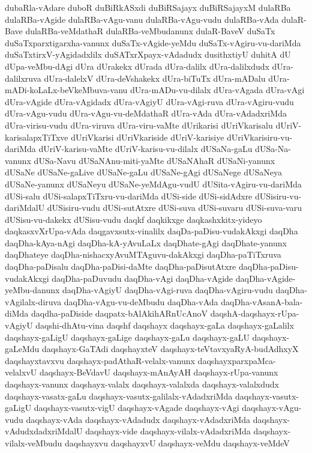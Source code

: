 {dubaRla-vAdare
duboR
duBiRkASxdi
duBiRSajayx
duBiRSajayxM
dulaRBa
dulaRBa-vAgide
dulaRBa-vAgu-vanu
dulaRBa-vAgu-vudu
dulaRBa-vAda
dulaR-Bave
dulaRBa-veMdathaR
dulaRBa-veMbudanunx
dulaR-BaveV
duSaTx
duSaTxparxtigarxha-vanunx
duSaTx-vAgide-yeMdu
duSaTx-vAgiru-vu-dariMda
duSaTxtirxV-yAgidadxlilx
duSATxrXpayx-vAdadudx
dusithxtiyU
duhitA
dU
dUpa-veMbu-dAgi
dUra
dUrakekx
dUrada
dUra-dalilx
dUra-dalilxdudx
dUra-dalilxruva
dUra-dalelxV
dUra-deVshakekx
dUra-biTuTx
dUra-mADalu
dUra-mADi-koLaLx-beVkeMbuva-vanu
dUra-mADu-vu-dilalx
dUra-vAgada
dUra-vAgi
dUra-vAgide
dUra-vAgidadx
dUra-vAgiyU
dUra-vAgi-ruva
dUra-vAgiru-vudu
dUra-vAgu-vudu
dUra-vAgu-vu-deMdathaR
dUra-vAda
dUra-vAdadxriMda
dUra-virisu-vudu
dUra-viruva
dUra-viru-vaMte
dUrikarisi
dUriVkarisalu
dUriV-karisalapxTiTxve
dUriVkarisi
dUriVkariside
dUriV-karisiye
dUriVkarisiru-vu-dariMda
dUriV-karisu-vaMte
dUriV-karisu-vu-dilalx
dUSaNa-gaLu
dUSa-Na-vanunx
dUSa-Navu
dUSaNAnu-miti-yaMte
dUSaNAhaR
dUSaNi-yanunx
dUSaNe
dUSaNe-gaLive
dUSaNe-gaLu
dUSaNe-gAgi
dUSaNege
dUSaNeya
dUSaNe-yanunx
dUSaNeyu
dUSaNe-yeMdAgu-vudU
dUSita-vAgiru-vu-dariMda
dUSi-salu
dUSi-salapxTiTxru-vu-dariMda
dUSi-side
dUSi-sidAdxre
dUSisiru-vu-dariMdalU
dUSisiru-vudu
dUSi-sutAtxre
dUSi-suva
dUSi-suvaru
dUSi-suva-varu
dUSisu-vu-dakekx
dUSisu-vudu
daqkf
daqkikxge
daqkashxkitx-yideyo
daqkasxvXrUpa-vAda
daqgavxsutx-vinalilx
daqDa-paDisu-vudakAkxgi
daqDha
daqDha-kAya-nAgi
daqDha-kA-yAvuLaLx
daqDhate-gAgi
daqDhate-yanunx
daqDhateye
daqDha-nishacxyAvuMTAguvu-dakAkxgi
daqDha-paTiTxruva
daqDha-paDisalu
daqDha-paDisi-daMte
daqDha-paDisutAtxre
daqDha-paDisu-vudakAkxgi
daqDha-paDuvudu
daqDha-vAgi
daqDha-vAgide
daqDha-vAgide-yeMbu-danunx
daqDha-vAgiyU
daqDha-vAgi-ruva
daqDha-vAgiru-vudu
daqDha-vAgilalx-diruva
daqDha-vAgu-vu-deMbudu
daqDha-vAda
daqDha-vAsanA-bala-diMda
daqdha-paDiside
daqpatx-bAlAkihARnUcAnoV
daqshA-daqshayx-rUpa-vAgiyU
daqshi-dhAtu-vina
daqshf
daqshayx
daqshayx-gaLa
daqshayx-gaLalilx
daqshayx-gaLigU
daqshayx-gaLige
daqshayx-gaLu
daqshayx-gaLU
daqshayx-gaLeMdu
daqshayx-GaTAdi
daqshayxteV
daqshayx-teVtavxyaRyA-budAdhxyX
daqshayxtavxvu
daqshayx-padAthaR-velalx-vanunx
daqshayxparxpaMca-velalxvU
daqshayx-BeVdavU
daqshayx-mAnAyAH
daqshayx-rUpa-vanunx
daqshayx-vanunx
daqshayx-valalx
daqshayx-valalxda
daqshayx-valalxdudx
daqshayx-vasatx-gaLu
daqshayx-vasutx-galilalx-vAdadxriMda
daqshayx-vasutx-gaLigU
daqshayx-vasutx-vigU
daqshayx-vAgade
daqshayx-vAgi
daqshayx-vAgu-vudu
daqshayx-vAda
daqshayx-vAdadudx
daqshayx-vAdadxriMda
daqshayx-vAdudxdadxriMdalU
daqshayx-vide
daqshayx-vilalx-vAdadxriMda
daqshayx-vilalx-veMbudu
daqshayxvu
daqshayxvU
daqshayx-veMdu
daqshayx-veMdeV
}
